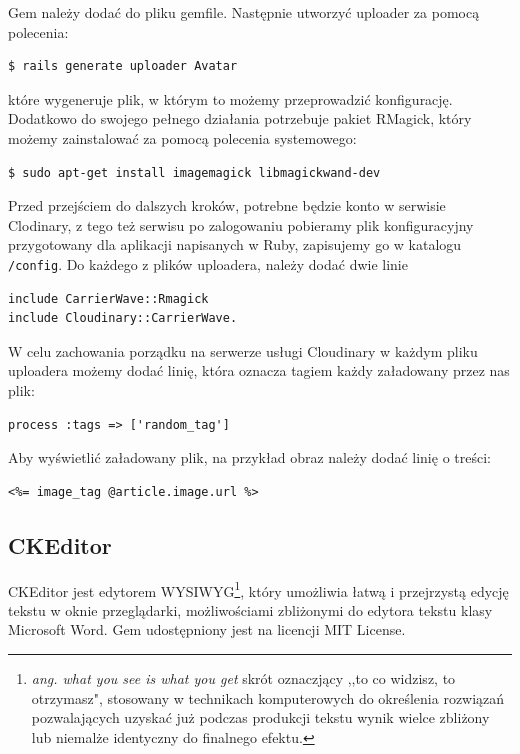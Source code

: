 \documentclass[openright]{xmgr}
\begin{document}
Gem należy dodać do pliku gemfile. Następnie utworzyć uploader za pomocą polecenia: 
\begin{lstlisting}[language=bashes, caption={Polecenie generujące plik uploadera}]
$ rails generate uploader Avatar
\end{lstlisting}
które wygeneruje plik, w którym to możemy przeprowadzić konfigurację. Dodatkowo do swojego pełnego działania potrzebuje pakiet RMagick, który możemy zainstalować za pomocą polecenia systemowego:
\begin{lstlisting}[language=bashes, caption={Polecenie instalujące oprogramowanie RMagick}]
$ sudo apt-get install imagemagick libmagickwand-dev
\end{lstlisting}
Przed przejściem do dalszych kroków, potrebne będzie konto w serwisie Clodinary, z tego też serwisu po zalogowaniu pobieramy plik konfiguracyjny przygotowany dla aplikacji napisanych w Ruby, zapisujemy go w katalogu \texttt{/config}. Do każdego z plików uploadera, należy dodać dwie linie 
\begin{lstlisting}[language=ruby2, caption={Framgent zawartości pliku uploadera}]
include CarrierWave::Rmagick
include Cloudinary::CarrierWave.
\end{lstlisting}

\newpage

W celu zachowania porządku na serwerze usługi Cloudinary w każdym pliku uploadera możemy dodać linię, która oznacza tagiem każdy załadowany przez nas plik: 
\begin{lstlisting}[language=ruby2, caption={Przykładowy tag dla pliku}]
process :tags => ['random_tag']
\end{lstlisting}
Aby wyświetlić załadowany plik, na przykład obraz należy dodać linię o treści: 
\begin{lstlisting}[language=ruby2, caption={Kod wyświetlający obraz}]
<%= image_tag @article.image.url %>
\end{lstlisting}

\subsection{CKEditor}
CKEditor \cite{ckeditor} jest edytorem WYSIWYG\footnote{\textit{ang. what you see is what you get} skrót oznaczjący ,,to co widzisz, to otrzymasz", stosowany w technikach komputerowych do określenia rozwiązań pozwalających uzyskać już podczas produkcji tekstu wynik wielce zbliżony lub niemalże identyczny do finalnego efektu.}, który umożliwia łatwą i przejrzystą edycję tekstu w oknie przeglądarki, możliwościami zbliżonymi do edytora tekstu klasy Microsoft Word. Gem udostępniony jest na licencji MIT License. 
\end{document}

